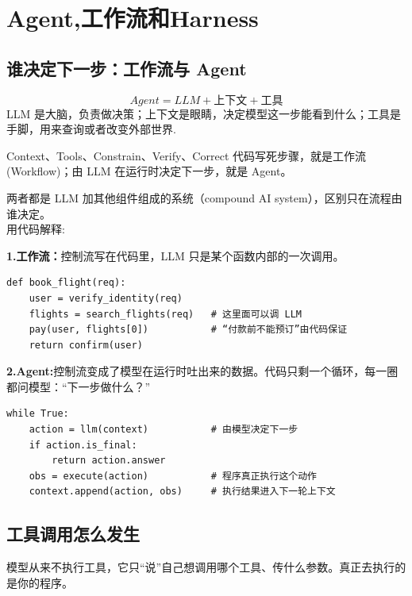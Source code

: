 \chapter{Agent,工作流和Harness}

\section{谁决定下一步：工作流与 Agent}

\[Agent=LLM+\text{上下文}+\text{工具}\]
LLM 是大脑，负责做决策；上下文是眼睛，决定模型这一步能看到什么；工具是手脚，用来查询或者改变外部世界.\\

\begin{tcolorbox}[colback=second!5, colframe=second, title=Agent\&工作流]
  Context、Tools、Constrain、Verify、Correct
  代码写死步骤，就是工作流(Workflow)；由 LLM 在运行时决定下一步，就是 Agent。
\end{tcolorbox}
两者都是 LLM 加其他组件组成的系统（compound AI system），区别只在流程由谁决定。\\

用代码解释:

\textbf{1.工作流：}控制流写在代码里，LLM 只是某个函数内部的一次调用。
\begin{lstlisting}[style=agentpython, caption={工作流}, label={lst:workflow}]
  def book_flight(req):
    user = verify_identity(req)
    flights = search_flights(req)   # 这里面可以调 LLM
    pay(user, flights[0])           # “付款前不能预订”由代码保证
    return confirm(user)
\end{lstlisting}

\textbf{2.Agent:}控制流变成了模型在运行时吐出来的数据。代码只剩一个循环，每一圈都问模型：“下一步做什么？”
\begin{lstlisting}[style=agentpython, caption={agent}, label={lst:agent-loop}]
  while True:
    action = llm(context)           # 由模型决定下一步
    if action.is_final:
        return action.answer
    obs = execute(action)           # 程序真正执行这个动作
    context.append(action, obs)     # 执行结果进入下一轮上下文
\end{lstlisting}

\section{工具调用怎么发生}
模型从来不执行工具，它只“说”自己想调用哪个工具、传什么参数。真正去执行的是你的程序。\\

